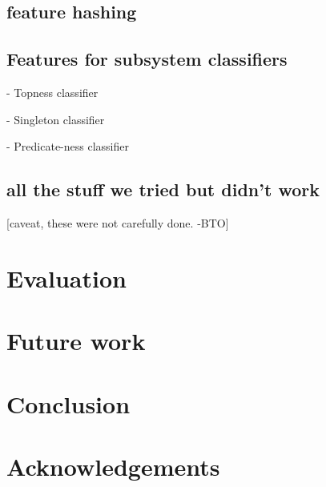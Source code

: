 \documentclass[11pt]{article}
\newcommand{\bocomment}[1]{\textcolor{Bittersweet}{[#1 -BTO]}}
\begin{document}
\subsection{feature hashing}


\subsection{Features for subsystem classifiers}

 - Topness classifier

 - Singleton classifier

 - Predicate-ness classifier


\subsection{all the stuff we tried but didn't work}

\bocomment{caveat, these were not carefully done.}


\section{Evaluation}
\label{s:datasplits}

\section{Future work}

\section{Conclusion}

\nocite{flanigan-etal:ACL2014}



\section*{Acknowledgements}



\end{document}

